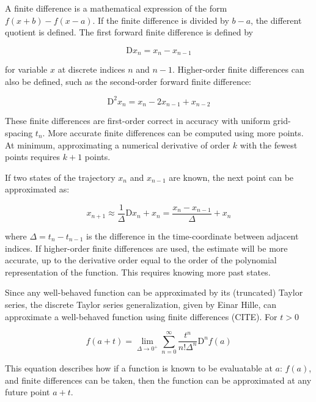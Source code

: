 \documentclass{article}
\begin{document}
A finite difference is a mathematical expression of the form $f(x + b) - f(x - a)$.
If the finite difference is divided by $b-a$, the different quotient is defined.
The first forward finite difference is defined by

\begin{equation}
  \mathrm{D}x_n = x_n - x_{n-1}
\end{equation}

for variable $x$ at discrete indices $n$ and $n-1$.
Higher-order finite differences can also be defined, such as the second-order forward finite difference:

\begin{equation}
  \mathrm{D}^2 x_n = x_n - 2 x_{n-1} + x_{n-2}
\end{equation}

These finite differences are first-order correct in accuracy with uniform grid-spacing $t_n$.
More accurate finite differences can be computed using more points.
At minimum, approximating a numerical derivative of order $k$ with the fewest points requires $k+1$ points.

If two states of the trajectory $x_n$ and $x_{n-1}$ are known, the next point can be approximated as:

\begin{equation}
  x_{n+1} \approx \frac{1}{\Delta} \mathrm{D}x_n + x_n = \frac{x_n - x_{n-1}}{\Delta} + x_n
\end{equation}

where $\Delta = t_n - t_{n-1}$ is the difference in the time-coordinate between adjacent indices.
If higher-order finite differences are used, the estimate will be more accurate,
up to the derivative order equal to the order of the polynomial representation of the function.
This requires knowing more past states.

Since any well-behaved function can be approximated by its (truncated) Taylor series,
the discrete Taylor series generalization, given by Einar Hille,
can approximate a well-behaved function using finite differences (CITE).
For $t > 0$

\begin{equation}
  \label{eq:hille}
  f(a + t) = \lim_{\Delta \rightarrow 0^+} \sum_{n=0}^{\infty} \frac{t^n}{n! \Delta^n} \mathrm{D}^n f(a)
\end{equation}

This equation describes how if a function is known to be evaluatable at $a$: $f(a)$,
and finite differences can be taken,
then the function can be approximated at any future point $a + t$.
\end{document}
